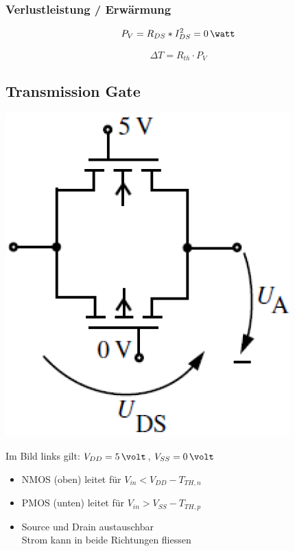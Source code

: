 \subsubsection{Verlustleistung / Erwärmung}

\begin{minipage}[c]{0.48\columnwidth}
    $$ P_V = R_{DS} * I_{DS}^2 = 0 \, \watt $$
\end{minipage}
\hfill
\begin{minipage}[c]{0.48\columnwidth}
    $$ \Delta T = R_{th} \cdot P_V $$
\end{minipage}


\subsection{Transmission Gate}

\begin{minipage}[c]{0.22\columnwidth}
    \includegraphics[width=\columnwidth]{images/transmission_gate.png}
\end{minipage}
\hfill
\begin{minipage}[c]{0.68\columnwidth}
    Im Bild links gilt: $V_{DD} = 5 \, \volt$, $V_{SS} = 0 \, \volt$ 

    \begin{itemize}
        \item NMOS (oben) leitet für $V_{in} < V_{DD} - T_{TH,n}$
        \item PMOS (unten) leitet für $V_{in} > V_{SS} - T_{TH,p}$
        \item Source und Drain austauschbar \\
            \textrightarrow Strom kann in beide Richtungen fliessen
    \end{itemize}
\end{minipage}
